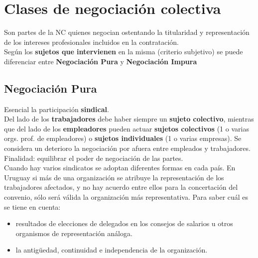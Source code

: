\documentclass[spanish,12pt,a4paper,titlepage]{report}
\begin{document}
\section{Clases de negociación colectiva}
Son partes de la NC quienes negocian ostentando la titularidad y representación de los intereses profesionales incluidos en la contratación.\\

Según los \textbf{sujetos que intervienen} en la misma (criterio subjetivo) se puede diferenciar entre \textbf{Negociación Pura} y \textbf{Negociación Impura}

\subsection*{Negociación Pura}
Esencial la participación \textbf{sindical}.\\

Del lado de los \textbf{trabajadores} debe haber siempre un \textbf{sujeto colectivo}, mientras que del lado de los \textbf{empleadores} pueden actuar \textbf{sujetos colectivos} (1 o varias orgs. prof. de empleadores) o \textbf{sujetos individuales} (1 o varias empresas). Se considera un deterioro la negociación por afuera entre empleados y trabajadores.\\

Finalidad: equilibrar el poder de negociación de las partes.\\

Cuando hay varios sindicatos se adoptan diferentes formas en cada país. En Uruguay si más de una  organización se atribuye la representación de los trabajadores afectados, y no hay acuerdo entre ellos para la concertación del convenio,  sólo  será  válida la organización más representativa. Para saber cuál es se tiene en cuenta:
\begin{itemize}
	\item resultados de elecciones de delegados en los consejos de salarios u otros organismos de representación análoga.
	\item la antigüedad, continuidad e independencia de la organización.
\end{itemize}
\end{document}

